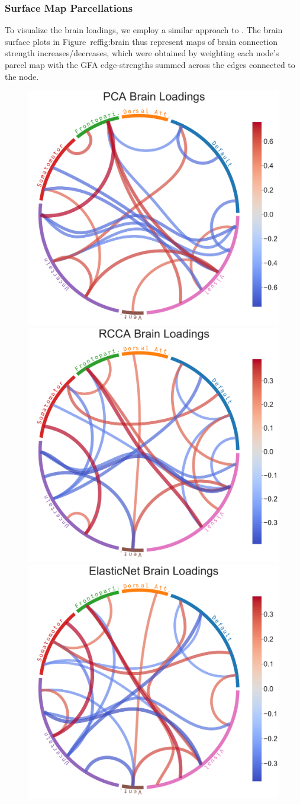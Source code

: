 \subsubsection{Surface Map Parcellations}
To visualize the brain loadings, we employ a similar approach to \citep{ferreira2022hierarchical, smith2015positive}.
The brain surface plots in Figure~ref{fig:brain} thus represent maps of brain connection strength increases/decreases, which
were obtained by weighting each node’s parcel map with the GFA edge-strengths summed across the edges
connected to the node.


\begin{figure}
\centering
\includegraphics[width=0.68\linewidth]{figures/regularization/hcp/PCA brain loadings.pdf}
\includegraphics[width=0.68\linewidth]{figures/regularization/hcp/RCCA brain loadings.pdf}
\includegraphics[width=0.68\linewidth]{figures/regularization/hcp/ElasticNet brain loadings.pdf}

\end{figure}
